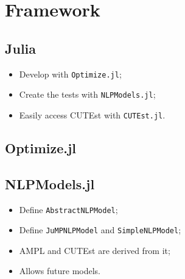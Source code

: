 \section{Framework}

\subsection{Julia}


\begin{frame}[fragile]
  \begin{itemize}
    \item Develop with \texttt{Optimize.jl};
    \item Create the tests with \texttt{NLPModels.jl};
    \item Easily access CUTEst with \texttt{CUTEst.jl}.
  \end{itemize}
\end{frame}

\subsection{Optimize.jl}


\subsection{NLPModels.jl}

\begin{frame}[fragile]
  \begin{itemize}
    \item Define \texttt{AbstractNLPModel};
    \item Define \texttt{JuMPNLPModel} and
      \texttt{SimpleNLPModel};
    \item AMPL and CUTEst are derived from it;
    \item Allows future models.
  \end{itemize}
\end{frame}

